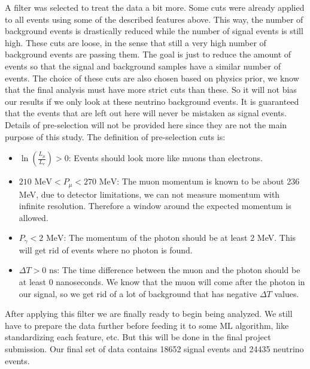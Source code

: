 A filter was selected to treat the data a bit more. Some cuts were already applied to all events using some of the described features above. This way, the number of background events is drastically reduced while the number of signal events is still high. These cuts are loose, in the sense that still a very high number of background events are passing them. The goal is just to reduce the amount of events so that the signal and background samples have a similar number of events. The choice of these cuts are also chosen based on physics prior, we know that the final analysis must have more strict cuts than these. So it will not bias our results if we only look at these neutrino background events. It is guaranteed that the events that are left out here will never be mistaken as signal events. Details of pre-selection will not be provided here since they are not the main purpose of this study. The definition of pre-selection cuts is:

\begin{itemize} 
\item $\ln{\left(\frac{L_{\mu}}{L_{e}}\right) > 0}$: Events should look more like muons than electrons.
\item $210 \textrm{ MeV} < P_{\mu} < 270 \textrm{ MeV}$: The muon momentum is known to be about 236 MeV, due to detector limitations, we can not measure momentum with infinite resolution. Therefore a window around the expected momentum is allowed.
\item $P_{\gamma} < 2 \textrm{ MeV}$: The momentum of the photon should be at least 2 MeV. This will get rid of events where no photon is found.
\item $\Delta T > 0 \textrm{ ns}$: The time difference between the muon and the photon should be at least 0 nanoseconds. We know that the muon will come after the photon in our signal, so we get rid of a lot of background that has negative $\Delta T$ values.
\end{itemize}

After applying this filter we are finally ready to begin being analyzed. We still have to prepare the data further before feeding it to some ML algorithm, like standardizing each feature, etc. But this will be done in the final project submission. Our final set of data contains 18652 signal events and 24435 neutrino events.